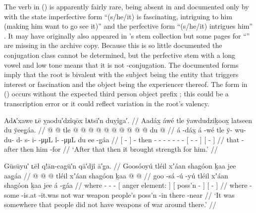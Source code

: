 The verb in (\lastx) is apparently fairly rare, being absent in \cite{story-naish:1973} and documented only by \citeauthor{leer:1976} with the state imperfective form  “(s/he/it) is fascinating, intriguing to him (making him want to go see it)” and the perfective form  “(s/he/it) intrigues him” \parencite[789]{leer:1976}.
It may have originally also appeared in \citeauthor{leer:1973}’s stem collection \parencite{leer:1973} but some pages for “” are missing in the archive copy.
Because this is so little documented the conjugation class cannot be determined, but the perfective stem  with a long vowel and low tone means that it is not -conjugation.
The documented forms imply that the root is bivalent with the subject being the entity that triggers interest or fascination and the object being the experiencer thereof.
The form in (\lastx) occurs without the expected third person object prefix ; this could be a transcription error or it could reflect variation in the root’s valency.

\ex\label{ex:93-49-brought-strength}%
%
\begingl
	\glpreamble	Adᴀ′xawe ʟē ỵaodu′dzîqōx łᴀtsī′n duỵîg̣a′. //
	\glpreamble	Aadáx̱ áwé tle ÿawdudziḵoox̱ latseen du ÿeeg̱áa. //
	\gla	{}  @ {} {}
		 @ {}
		tle  @ {} @ {} @ {} @ {} @ {} @ {} @ {}
		{}  @ {} @ {} @ {} {}
		{} du  @ {} {} //
	\glb	{} á -dáx̱ {}
		á -wé
		tle ÿ- wu- du- d- s- i-  -μμL
		{} l-  -μμL {} {}
		{} du ee -g̱áa {} //
	\glc	{}[  - {}]
		 -
		then - - - - - -  -
		{}[ -  - \· {}]
		{}[   - {}] //
	\gld	{} that -after {}
		 {}
		then  {} {} {} {} {} {} {}
		{}  {} {} {} {}
		{} him {} -for {} //
	\glft	‘After that then it brought strength for him.’
		//
\endgl
\xe

\ex\label{ex:93-50-no-weapons}%
%
\begingl
	\glpreamble	Gūsūyu′ ʟēł q!ān-cagū′n qā′djî ā′g̣a. //
	\glpreamble	Goosóoyú tléil xʼáan shagóon ḵaa jee aag̱áa //
	\gla	{} @ {} @ {} @ {}
		tléil
		{} xʼáan shagóon {}
		{} ḵaa  @ {} {}
		{}  @ {} {} //
	\glb	goo -sá -ú -yú
		tléil
		{} xʼáan shagóon {}
		{} ḵaa jee {} {}
		{} á -g̱áa {} //
	\glc	where - - -
		{}[ anger element: {}]
		{}[  poss’n - {}]
		{}[  - {}] //
	\gld	where -some -is.at -it.was
		not
		{} war weapon {}
		{} people’s poss’n -in {}
		{} there -near {} //
	\glft	‘It was somewhere that people did not have weapons of war around there.’
		//
\endgl
\xe

